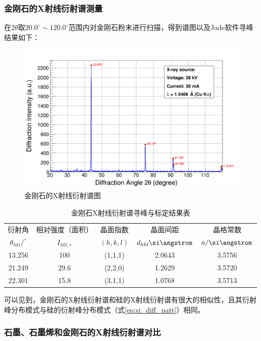 \documentclass{thuemp}
\begin{document}
\subsubsection{金刚石的X射线衍射谱测量}

在$2\theta$取$20.0^\circ \sim 120.0^\circ$范围内对金刚石粉末进行扫描，得到谱图以及Jade软件寻峰结果如下：

\begin{figure}[H]
    \centering
    \includegraphics[width=0.8\linewidth]{../Data/C-Diamond-multi.png}
    \caption{金刚石的X射线衍射谱图}
    \label{fig:diamond_xrd}
\end{figure}

\begin{table}
    \centering
    \captionnamefont{\wuhao\bf\heiti}
    \captiontitlefont{\wuhao\bf\heiti}
    \caption{金刚石X射线衍射谱寻峰与标定结果表}
    \label{tab:diamond_xrd}
    \liuhao
    \begin{tabular}{ccccc}
        \toprule
        衍射角 & 相对强度（面积）& 晶面指数 & 晶面间距 & 晶格常数 \\
        $\theta_{hkl}/^\circ$ & $I_{hkl,r}$ & $(h,k,l)$ & $d_{hkl}\text{\si\angstrom}$ & $a/\text{\si\angstrom}$\\
        \midrule
        13.256 &  100 & (1,1,1) &  2.0643 & 3.5756 \\
        21.249 & 29.6 & (2,2,0) &  1.2629 & 3.5720 \\
        22.301 & 15.8 & (3,1,1) &  1.0768 & 3.5713 \\
        \bottomrule
    \end{tabular}
\end{table}

可以见到，金刚石的X射线衍射谱和硅的X射线衍射谱有很大的相似性，且其衍射峰分布模式与硅的衍射峰分布模式（式\ref{eq:si_diff_patt}）相同。

\subsubsection{石墨、石墨烯和金刚石的X射线衍射谱对比}
\end{document}
